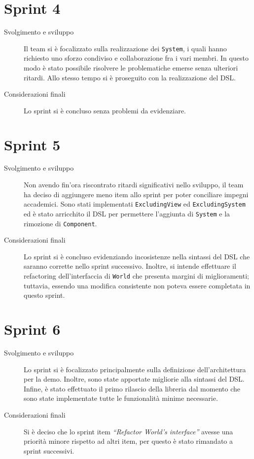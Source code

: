 \section{Sprint 4}\label{sec:sprint-4}
\begin{description}
    \item[Svolgimento e sviluppo] Il team si è focalizzato sulla realizzazione dei \texttt{System}, i quali hanno
    richiesto uno sforzo condiviso e collaborazione fra i vari membri.
    In questo modo è stato possibile risolvere le problematiche emerse senza ulteriori ritardi.
    Allo stesso tempo si è proseguito con la realizzazione del DSL\@.
    \item[Considerazioni finali] Lo sprint si è concluso senza problemi da evidenziare.
\end{description}
\section{Sprint 5}\label{sec:sprint-5}
\begin{description}
    \item[Svolgimento e sviluppo] Non avendo fin'ora riscontrato ritardi significativi nello sviluppo, il team ha deciso
    di aggiungere meno item allo sprint per poter conciliare impegni accademici.
    Sono stati implementati \texttt{ExcludingView} ed \texttt{ExcludingSystem} ed è stato arricchito il DSL per
    permettere l'aggiunta di \texttt{System} e la rimozione di \texttt{Component}.
    \item[Considerazioni finali] Lo sprint si è concluso evidenziando incosistenze nella sintassi del DSL che saranno
    corrette nello sprint successivo.
    Inoltre, si intende effettuare il refactoring dell'interfaccia di \texttt{World} che presenta margini di
    miglioramenti;
    tuttavia, essendo una modifica consistente non poteva essere completata in questo sprint.
\end{description}
\section{Sprint 6}\label{sec:sprint-6}
\begin{description}
    \item[Svolgimento e sviluppo] Lo sprint si è focalizzato principalmente sulla definizione dell'architettura per la
    demo.
    Inoltre, sono state apportate migliorie alla sintassi del DSL\@.
    Infine, è stato effettuato il primo rilascio della libreria dal momento che sono state implementate tutte le
    funzionalità minime necessarie.
    \item[Considerazioni finali] Si è deciso che lo sprint item \textit{``Refactor World's interface''} avesse una
    priorità minore rispetto ad altri item, per questo è stato rimandato a sprint successivi.
\end{description}
